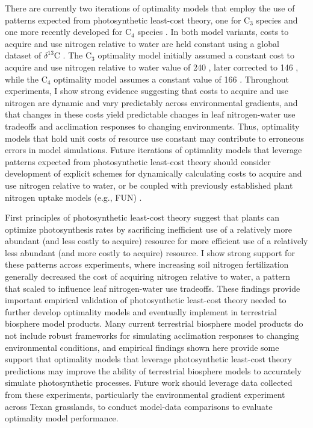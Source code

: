 There are currently two iterations of optimality models that employ the use of patterns expected from photosynthetic least-cost theory, one for C$_3$ species  and one more recently developed for C$_4$ species . In both model variants, costs to acquire and use nitrogen relative to water are held constant using a global dataset of $\delta^{13}$C . The C$_3$ optimality model initially assumed a constant cost to acquire and use nitrogen relative to water value of 240 , later corrected to 146 , while the C$_4$ optimality model assumes a constant value of 166 . Throughout experiments, I show strong evidence suggesting that costs to acquire and use nitrogen are dynamic and vary predictably across environmental gradients, and that changes in these costs yield predictable changes in leaf nitrogen-water use tradeoffs and acclimation responses to changing environments. Thus, optimality models that hold unit costs of resource use constant may contribute to erroneous errors in model simulations. Future iterations of optimality models that leverage patterns expected from photosynthetic least-cost theory should consider development of explicit schemes for dynamically calculating costs to acquire and use nitrogen relative to water, or be coupled with previously established plant nitrogen uptake models (e.g., FUN) .

First principles of photosynthetic least-cost theory suggest that plants can optimize photosynthesis rates by sacrificing inefficient use of a relatively more abundant (and less costly to acquire) resource for more efficient use of a relatively less abundant (and more costly to acquire) resource. I show strong support for these patterns across experiments, where increasing soil nitrogen fertilization generally decreased the cost of acquiring nitrogen relative to water, a pattern that scaled to influence leaf nitrogen-water use tradeoffs. These findings provide important empirical validation of photosynthetic least-cost theory needed to further develop optimality models and eventually implement in terrestrial biosphere model products. Many current terrestrial biosphere model products do not include robust frameworks for simulating acclimation responses to changing environmental conditions, and empirical findings shown here provide some support that optimality models that leverage photosynthetic least-cost theory predictions may improve the ability of terrestrial biosphere models to accurately simulate photosynthetic processes. Future work should leverage data collected from these experiments, particularly the environmental gradient experiment across Texan grasslands, to conduct model-data comparisons to evaluate optimality model performance.

